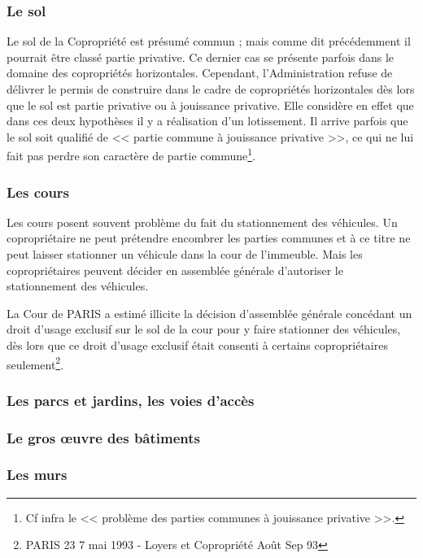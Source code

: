 		\subsubsection{Le sol}
		
		Le sol de la Copropriété est présumé commun ; mais comme dit précédemment il pourrait être classé
		partie privative. Ce dernier cas se présente parfois dans le domaine des copropriétés horizontales.
		Cependant, l’Administration refuse de délivrer le permis de construire dans le cadre de copropriétés
		horizontales dès lors que le sol est partie privative ou à jouissance privative. Elle considère en effet
		que dans ces deux hypothèses il y a réalisation d’un lotissement.
		Il arrive parfois que le sol soit qualifié de << partie commune à jouissance privative >>, ce qui ne lui fait pas
		perdre son caractère de partie commune\footnote{Cf infra le << problème des parties communes à jouissance privative >>.}.
		
		\subsubsection{Les cours}
		
		Les cours posent souvent problème du fait du stationnement des véhicules. Un copropriétaire ne peut
		prétendre encombrer les parties communes et à ce titre ne peut laisser stationner un véhicule dans la cour
		de l'immeuble. Mais les copropriétaires peuvent décider en assemblée générale d'autoriser le
		stationnement des véhicules.
		
		La Cour de PARIS a estimé illicite la décision d'assemblée générale concédant un droit d'usage
		exclusif sur le sol de la cour pour y faire stationner des véhicules, dès lors que ce droit d'usage exclusif
		était consenti à certains copropriétaires seulement\footnote{PARIS 23\degre{} 7 mai 1993 - Loyers et Copropriété Août Sep 93 }.
		
		\subsubsection{Les parcs et jardins, les voies d'accès}
		
		\subsubsection{Le gros œuvre des bâtiments}
		
		\subsubsection{Les murs}
		
